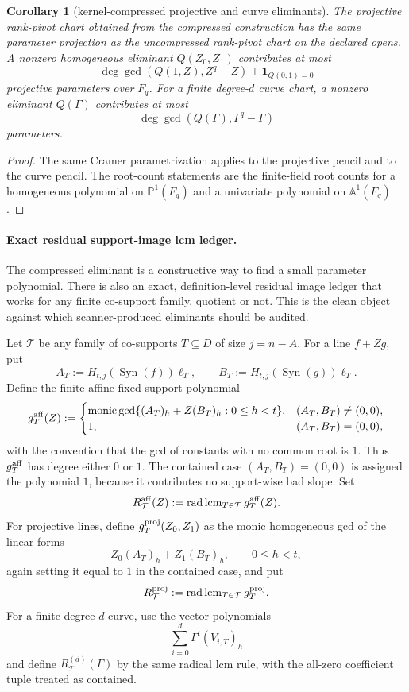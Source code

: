 \documentclass[11pt]{article}
\newtheorem{corollary}[theorem]{Corollary}
\theoremstyle{definition}
\theoremstyle{remark}
\newcommand{\Syn}{\operatorname{Syn}}
\begin{document}
\begin{corollary}[kernel-compressed projective and curve eliminants]
\label{cor:kernel-compressed-projective-curve-eliminants}
The projective rank-pivot chart obtained from the compressed construction has the
same parameter projection as the uncompressed rank-pivot chart on the declared
opens.  A nonzero homogeneous eliminant $Q(Z_0,Z_1)$ contributes at most
\[
        \deg\gcd(Q(1,Z),Z^q-Z)+\mathbf 1_{Q(0,1)=0}
\]
projective parameters over $F_q$.  For a finite degree-$d$ curve chart, a nonzero
eliminant $Q(\Gamma)$ contributes at most
\[
        \deg\gcd(Q(\Gamma),\Gamma^q-\Gamma)
\]
parameters.
\end{corollary}

\begin{proof}
The same Cramer parametrization applies to the projective pencil and to the
curve pencil.  The root-count statements are the finite-field root counts for a
homogeneous polynomial on $\mathbb P^1(F_q)$ and a univariate polynomial on
$\mathbb A^1(F_q)$.
\end{proof}

\paragraph{Exact residual support-image lcm ledger.}
The compressed eliminant is a constructive way to find a small parameter
polynomial.  There is also an exact, definition-level residual image ledger that
works for any finite co-support family, quotient or not.  This is the clean
object against which scanner-produced eliminants should be audited.

Let $\mathcal T$ be any family of co-supports $T\subseteq D$ of size $j=n-A$.
For a line $f+Zg$, put
\[
        A_T:=H_{t,j}(\Syn(f))\boldsymbol\ell_T,
        \qquad
        B_T:=H_{t,j}(\Syn(g))\boldsymbol\ell_T .
\]
Define the finite affine fixed-support polynomial
\[
        g_T^{\rm aff}(Z):=
        \begin{cases}
        \operatorname{monic}\gcd\{(A_T)_h+Z(B_T)_h:0\le h<t\},
             & (A_T,B_T)\ne(0,0),\\
        1,   & (A_T,B_T)=(0,0),
        \end{cases}
\]
with the convention that the gcd of constants with no common root is $1$.  Thus
$g_T^{\rm aff}$ has degree either $0$ or $1$.  The contained case
$(A_T,B_T)=(0,0)$ is assigned the polynomial $1$, because it contributes no
support-wise bad slope.
Set
\[
        R_{\mathcal T}^{\rm aff}(Z):=
        \operatorname{rad}\operatorname{lcm}_{T\in\mathcal T}g_T^{\rm aff}(Z).
\]
For projective lines, define $g_T^{\rm proj}(Z_0,Z_1)$ as the monic homogeneous
gcd of the linear forms
\[
        Z_0(A_T)_h+Z_1(B_T)_h,
        \qquad 0\le h<t,
\]
again setting it equal to $1$ in the contained case, and put
\[
        R_{\mathcal T}^{\rm proj}:=
        \operatorname{rad}\operatorname{lcm}_{T\in\mathcal T}g_T^{\rm proj}.
\]
For a finite degree-$d$ curve, use the vector polynomials
\[
        \sum_{i=0}^{d}\Gamma^i(V_{i,T})_h
\]
and define $R_{\mathcal T}^{(d)}(\Gamma)$ by the same radical lcm rule, with the
all-zero coefficient tuple treated as contained.
\end{document}
